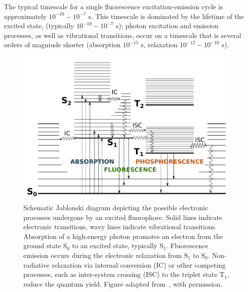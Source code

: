 The typical timescale for a single fluorescence excitation-emission cycle is approximately $10^{-10} - 10^{-7}$ s. This timescale is dominated by the lifetime of the excited state, (typically $10^{-10} - 10^{-7}$ s); photon excitation and emission processes, as well as vibrational transitions, occur on a timescale that is several orders of magniude shorter (absorption $10^{-15}$ s, relaxation $10^{-12} - 10^{-10}$ s).

\begin{figure}[!ht]
   \begin{center}
      \includegraphics*[clip=true, width=6in]{introduction/jablonski.pdf}
      \caption{Schematic Jablonski diagram depicting the possible electronic processes undergone by an excited fluorophore. Solid lines indicate electronic transitions, wavy lines indicate vibrational transitions. Absorption of a high-energy photon promotes an electron from the ground state $\text{S}_0$ to an excited state, typically $\text{S}_1$. Fluorescence emission occurs during the electronic relaxation from $\text{S}_1$ to $\text{S}_0$. Non-radiative relaxation via internal conversion (IC) or other competing processes, such as inter-system crossing (ISC) to the triplet state $\text{T}_1$, reduce the quantum yield. Figure adapted from~\cite{Horrocks2014}, with permission.}
      \label{fig:jablonski}
   \end{center}
\end{figure}

